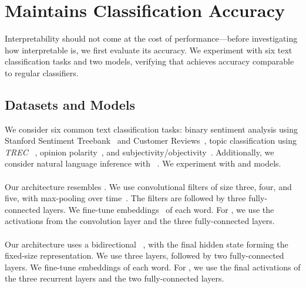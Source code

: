 \section{\dknn{} Maintains Classification Accuracy}
\label{sec:experiments}

Interpretability should not come at the cost of performance---before investigating
how interpretable \dknn{} is, we first evaluate its accuracy. We
experiment with six text classification tasks and two models,
verifying that \dknn{} achieves accuracy comparable to regular classifiers.

\subsection{Datasets and Models}

We consider six common text classification tasks: binary sentiment analysis
using Stanford Sentiment Treebank~\cite[]{socher2013recursive} and
Customer Reviews~\cite[]{hu2004mining}, topic classification using
\emph{TREC} ~\cite{li2002trec}, opinion
polarity~\cite[]{wiebe2005mpqa}, and
subjectivity/objectivity~\cite[]{pang2004subj}. Additionally, we
consider natural language inference with ~\cite{bowman2015snli}.
We experiment with \bilstm{} and \cnn{} models.

\paragraph{\cnn{}}
Our \cnn{} architecture resembles \citet{kim2014convolutional}. We
use convolutional filters of size three, four, and five, with max-pooling over
time~\cite{collobert2008unified}. The filters are followed by
three fully-connected layers. We fine-tune 
embeddings~\cite{pennington2014glove} of each word. For \dknn{}, we use the
activations from the convolution layer and the three fully-connected layers.

\paragraph{\bilstm{}}
Our architecture uses a bidirectional \lstm{}~\cite{graves2005framewise}, with
the final hidden state forming the fixed-size
representation. We use three \lstm{} layers, followed by
two fully-connected layers. We fine-tune 
embeddings of each word. For \dknn{},
we use the final activations of the three recurrent layers and
the two fully-connected layers.

